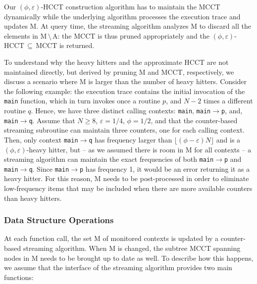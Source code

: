 Our $(\phi,\varepsilon)$-HCCT construction algorithm has to maintain the MCCT dynamically while the underlying algorithm processes the execution trace and updates M. At query time, the streaming algorithm analyzes M to discard all the elements in M$\,\setminus\,$A: the MCCT is thus pruned appropriately and the $(\phi,\varepsilon)$-HCCT$\,\subseteq\,$MCCT is returned.

\begin{example}
To understand why the heavy hitters and the approximate HCCT are not maintained directly, but derived by pruning M and MCCT, respectively, we discuss a scenario where M is larger than the number of heavy hitters. Consider the following example: the execution trace contains the initial invocation of the {\tt main} function, which in turn invokes once a routine $p$, and $N-2$ times a different routine $q$. Hence, we have three distinct calling contexts: {\tt main}, {\tt main}$\rightarrow${\tt p}, and, {\tt main}$\rightarrow${\tt q}. Assume that $N\ge 8$, $\varepsilon=1/4$, $\phi=1/2$, and that the counter-based streaming subroutine can maintain three counters, one for each calling context. Then, only context {\tt main}$\rightarrow${\tt q} has frequency larger than $\lfloor(\phi-\varepsilon)N\rfloor$ and is a $(\phi,\varepsilon)$-heavy hitter, but -- as we assumed there is room in M for all contexts -- a streaming algorithm can maintain the exact frequencies of both {\tt main}$\rightarrow${\tt p} and {\tt main}$\rightarrow${\tt q}. Since {\tt main}$\rightarrow${\tt p} has frequency 1, it would be an error returning it as a heavy hitter. For this reason, M needs to be post-processed in order to eliminate low-frequency items that may be included when there are more available counters than heavy hitters.
\end{example}

\subsubsection*{Data Structure Operations}
At each function call, the set M of monitored contexts is updated by a counter-based streaming algorithm. When M is changed, the subtree MCCT spanning nodes in M needs to be brought up to date as well. To describe how this happens, we assume that the interface of the streaming algorithm provides two main functions:


